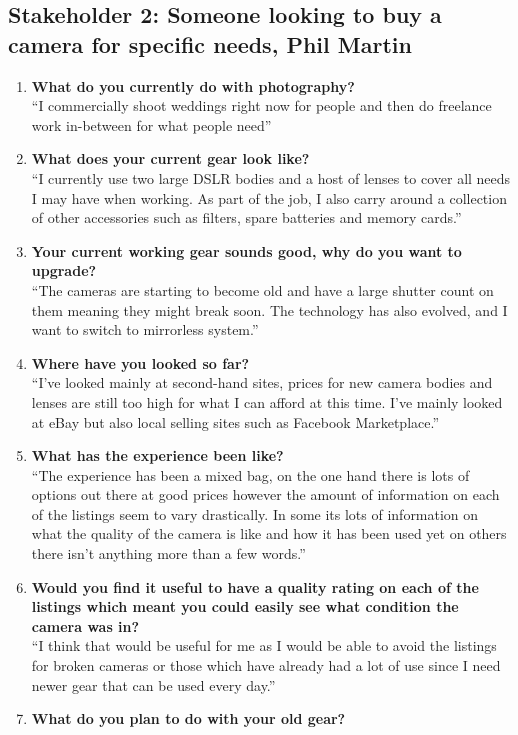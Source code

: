 \subsection{Stakeholder 2: Someone looking to buy a camera for specific needs, Phil Martin}
\begin{enumerate}
\item \textbf{What do you currently do with photography?} \\
“I commercially shoot weddings right now for people and then do freelance work in-between for what people need”
\item \textbf{What does your current gear look like?} \\
“I currently use two large DSLR bodies and a host of lenses to cover all needs I may have when working. As part of the job, I also carry around a collection of other accessories such as filters, spare batteries and memory cards.”
\item \textbf{Your current working gear sounds good, why do you want to upgrade?} \\
“The cameras are starting to become old and have a large shutter count on them meaning they might break soon. The technology has also evolved, and I want to switch to mirrorless system.”
\item \textbf{Where have you looked so far?} \\
“I’ve looked mainly at second-hand sites, prices for new camera bodies and lenses are still too high for what I can afford at this time. I’ve mainly looked at eBay but also local selling sites such as Facebook Marketplace.”
\item \textbf{What has the experience been like?} \\
“The experience has been a mixed bag, on the one hand there is lots of options out there at good prices however the amount of information on each of the listings seem to vary drastically. In some its lots of information on what the quality of the camera is like and how it has been used yet on others there isn’t anything more than a few words.”
\item \textbf{Would you find it useful to have a quality rating on each of the listings which meant you could easily see what condition the camera was in?} \\
“I think that would be useful for me as I would be able to avoid the listings for broken cameras or those which have already had a lot of use since I need newer gear that can be used every day.”
\item \textbf{What do you plan to do with your old gear?} \\

\end{enumerate}
